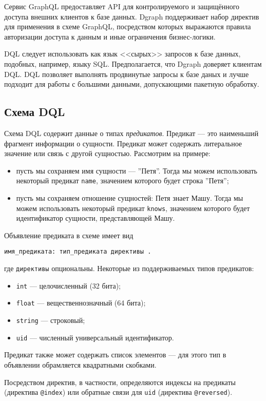 Сервис GraphQL предоставляет API для контролируемого и защищённого доступа внешних клиентов к базе
данных. Dgraph поддерживает набор директив для применения в схеме GraphQL, посредством которых
выражаются правила авторизации доступа к данным и иные ограничения бизнес-логики.

DQL следует использовать как язык <<сырых>> запросов к базе данных, подобных, например, языку SQL. 
Предполагается, что Dgraph доверяет клиентам DQL. DQL позволяет выполнять продвинутые запросы к
базе даных и лучше подходит для работы с большими данными, допускающими пакетную обработку.

\subsection{Схема DQL}

Схема DQL содержит данные о типах \textit{предикатов}. Предикат --- это наименьший фрагмент
информации о сущности. Предикат может содержать литеральное значение или связь с другой сущностью.
Рассмотрим на примере:
\begin{itemize}
  \item пусть мы сохраняем имя сущности --- ''Петя''. Тогда мы можем использовать некоторый
    предикат \texttt{name}, значением которого будет строка ''Петя'';
  \item пусть мы сохраняем отношение сущностей: Петя знает Машу. Тогда мы можем использовать некоторый
    предикат \texttt{knows}, значением которого будет идентификатор сущности, представляющей Машу.
\end{itemize}

Объявление предиката в схеме имеет вид
\begin{Verbatim}
имя_предиката: тип_предиката директивы .
\end{Verbatim}
где \texttt{директивы} опциональны. Некоторые из поддерживаемых типов предикатов:
\begin{itemize}
    \item \texttt{int} --- целочисленный (32 бита);
    \item \texttt{float} --- вещественнозначный (64 бита);
    \item \texttt{string} --- строковый;
    \item \texttt{uid} --- численный универсальный идентификатор.
\end{itemize}
Предикат также может содержать список элементов --- для этого тип в объявлении обрамляется
квадратными скобками.

Посредством директив, в частности, определяются индексы на предикаты (директива \texttt{@index})
или обратные связи для \texttt{uid} (директива \texttt{@reversed}).

